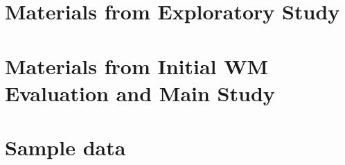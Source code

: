 \documentclass[10pt,a4paper]{report} %
\begin{document}

\chapter{Materials from Exploratory Study}

\label{chap:appendices-exploratory-study-material}



% 





\chapter{Materials from Initial WM Evaluation and Main Study}

\label{chap:appendices-main-study-material}



% 



\chapter{Sample data}

\label{chap:appendices--study-data}





%

% 





\renewcommand{\thefootnote}{\@arabic\c@figure}

\makeatother
\end{document}
